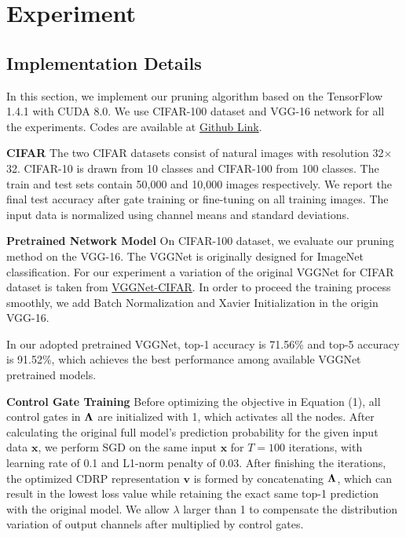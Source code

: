 \documentclass[conference]{IEEEtran}
\begin{document}
\section{Experiment}

\subsection{Implementation Details}
In this section, we implement our pruning algorithm based on the TensorFlow 1.4.1 with CUDA 8.0. We use CIFAR-100 dataset and VGG-16 network for all the experiments. Codes are available at \href{https://github.com/lidongyue12138/CriticalPathPruning}{Github Link}.

\textbf{CIFAR} \; The two CIFAR datasets consist of natural images with resolution 32$\times$32. CIFAR-10 is drawn from 10 classes and CIFAR-100 from 100 classes. The train and test sets contain 50,000 and 10,000 images respectively. We report the final test accuracy after gate training or fine-tuning on all training images. The input data is normalized using channel means and standard deviations.

\textbf{Pretrained Network Model} \; On CIFAR-100 dataset, we evaluate our pruning method on the VGG-16\cite{simonyan2014very}. The VGGNet is originally designed for ImageNet classification. For our experiment a variation of the original VGGNet for CIFAR dataset is taken from \href{https://github.com/BoyuanFeng/vggNet-71.56-on-CIFAR100-with-Tensorflow}{VGGNet-CIFAR}. In order to proceed the training process smoothly, we add Batch Normalization and Xavier Initialization in the origin VGG-16.

In our adopted pretrained VGGNet, top-1 accuracy is 71.56\% and top-5 accuracy is 91.52\%, which achieves the best performance among available VGGNet pretrained models.

\textbf{Control Gate Training} \; Before optimizing the objective in Equation (1), all control gates in $\bf \Lambda$ are initialized with 1, which activates all the nodes. After calculating the original full model’s prediction probability for the given input data $\textbf{x}$, we perform SGD on the same input $\bm{x}$ for $T=100$ iterations, with learning rate of 0.1 and L1-norm penalty of 0.03. After finishing the iterations, the optimized CDRP representation $\bm{v}$ is formed by concatenating $\bf \Lambda$, which can result in the lowest loss value while retaining the exact same top-1 prediction with the original model. We allow $\lambda$ larger than 1 to compensate the distribution variation of output channels after multiplied by control gates. 
\end{document}
